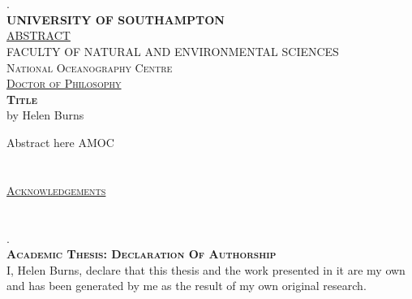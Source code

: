 \documentclass[a4paper,12pt, openright, titlepage, twoside]{book}
\begin{document}
\thispagestyle{empty}
\frontmatter
\chapter[Abstract]{}

. \\[-5.51cm]
\textsc{ \textbf{\textsc{UNIVERSITY OF SOUTHAMPTON}}}\\ 
\textsc{\large \uline{ABSTRACT}}\\[0.1cm]

\textsc{\small FACULTY OF NATURAL AND ENVIRONMENTAL SCIENCES}\\[0.05cm] 
\textsc{\footnotesize National Oceanography Centre }\\[0.05cm]
\textsc{\uline{Doctor of Philosophy}}\\[0.1cm]

\textbf{\textsc{\large Title}}\\[0.01cm]
{by Helen Burns}\\[0.2cm]
\justify
\linespread{1}

Abstract here
\gls{AMOC}
\pagestyle{empty}
\clearpage
\chapter[Acknowledgements]{}
\setcounter{page}{2}
\textsc{\large \uline{Acknowledgements}}\\
\clearpage
\tableofcontents
\clearpage
\listoftables
\listoffigures

\clearpage
\frontmatter
\chapter[Declaration of authorship]{}
. \\[-6.51cm]
\textbf{\textsc{\Large Academic Thesis: Declaration Of Authorship}}\\[0.5cm]


\noindent I, Helen Burns, declare that this thesis and the work presented in it are my own and has been generated by me as the result of my own original research.\\[0.3cm]

\end{document}
